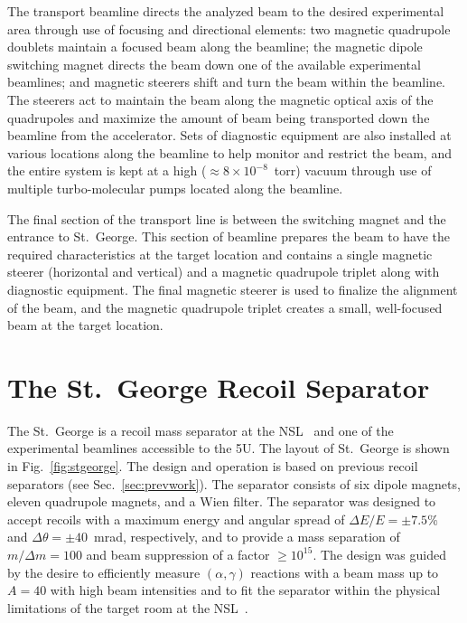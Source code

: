 The transport beamline directs the analyzed beam to the desired
experimental area through use of focusing and directional elements: two
magnetic quadrupole doublets maintain a focused beam along the beamline;
the magnetic dipole switching magnet directs the beam down one of the
available experimental beamlines; and magnetic steerers shift and turn
the beam within the beamline. The steerers act to maintain the beam
along the magnetic optical axis of the quadrupoles and maximize the
amount of beam being transported down the beamline from the accelerator.
Sets of diagnostic equipment are also installed at various locations
along the beamline to help monitor and restrict the beam, and the entire
system is kept at a high ($\approx 8\times 10^{-8}$~torr) vacuum through
use of multiple turbo-molecular pumps located along the beamline.

The final section of the transport line is between the switching magnet
and the entrance to St.\ George. This section of beamline prepares the
beam to have the required characteristics at the target location and
contains a single magnetic steerer (horizontal and vertical) and a
magnetic quadrupole triplet along with diagnostic equipment. The final
magnetic steerer is used to finalize the alignment of the beam, and the
magnetic quadrupole triplet creates a small, well-focused beam at the
target location.


\section{The St.\ George Recoil Separator}
\label{sec:stg}

The St.\ George is a recoil mass separator at the NSL~\cite{Couder2008}
and one of the experimental beamlines accessible to the 5U.
The layout of St.\ George is shown in Fig.~\ref{fig:stgeorge}.
The design
and operation is based on previous recoil separators (see
Sec.~\ref{sec:prevwork}). The separator consists of six dipole magnets,
eleven quadrupole magnets, and a Wien filter. The separator was designed
to accept recoils with a maximum energy and angular spread of $\Delta
E/E = \pm7.5\%$ and $\Delta\theta = \pm40$~mrad, respectively, and to
provide a mass separation of $m/\Delta m = 100$ and beam suppression of
a factor $\geq 10^{15}$. The design was guided by the desire to
efficiently measure $(\alpha,\gamma)$ reactions with a beam mass up to
$A = 40$ with high beam intensities and to fit the separator within the
physical limitations of the target room at the NSL~\cite{Couder2008}.

